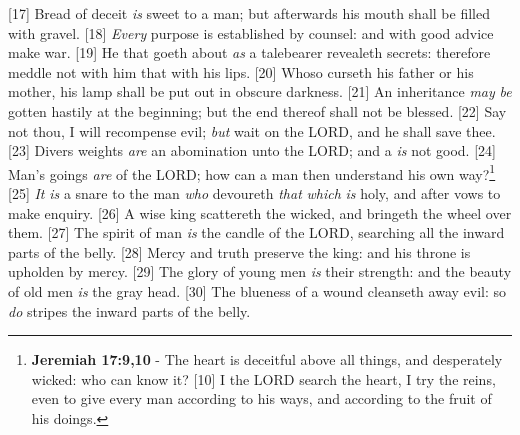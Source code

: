 [17] \textcolor[cmyk]{0.99998,1,0,0}{Bread of deceit \emph{is} sweet to a man; but afterwards his mouth shall be filled with gravel.}
[18] \textcolor[cmyk]{0.99998,1,0,0}{\emph{Every} purpose is established by counsel: and with good advice make war.}
[19] \textcolor[cmyk]{0.99998,1,0,0}{He that goeth about \emph{as} a talebearer revealeth secrets: therefore meddle not with him that  with his lips.}
[20] \textcolor[cmyk]{0.99998,1,0,0}{Whoso curseth his father or his mother, his lamp shall be put out in obscure darkness.}
[21] \textcolor[cmyk]{0.99998,1,0,0}{An inheritance \emph{may} \emph{be} gotten hastily at the beginning; but the end thereof shall not be blessed.}
[22] \textcolor[cmyk]{0.99998,1,0,0}{Say not thou, I will recompense evil; \emph{but} wait on the LORD, and he shall save thee.}
[23] \textcolor[cmyk]{0.99998,1,0,0}{Divers weights \emph{are} an abomination unto the LORD; and a  \emph{is} not good.}
[24] \textcolor[cmyk]{0.99998,1,0,0}{Man's goings \emph{are} of the LORD; how can a man then understand his own way?}\footnote{\textbf{Jeremiah 17:9,10} - The heart is deceitful above all things, and desperately wicked: who can know it? [10] I the LORD search the heart, I try the reins, even to give every man according to his ways, and according to the fruit of his doings.}
[25] \textcolor[cmyk]{0.99998,1,0,0}{\emph{It} \emph{is} a snare to the man \emph{who} devoureth \emph{that} \emph{which} \emph{is} holy, and after vows to make enquiry.}
[26] \textcolor[cmyk]{0.99998,1,0,0}{A wise king scattereth the wicked, and bringeth the wheel over them.}
[27] \textcolor[cmyk]{0.99998,1,0,0}{The spirit of man \emph{is} the candle of the LORD, searching all the inward parts of the belly.}
[28] \textcolor[cmyk]{0.99998,1,0,0}{Mercy and truth preserve the king: and his throne is upholden by mercy.}
[29] \textcolor[cmyk]{0.99998,1,0,0}{The glory of young men \emph{is} their strength: and the beauty of old men \emph{is} the gray head.}
[30] \textcolor[cmyk]{0.99998,1,0,0}{The blueness of a wound cleanseth away evil: so \emph{do} stripes the inward parts of the belly.}




